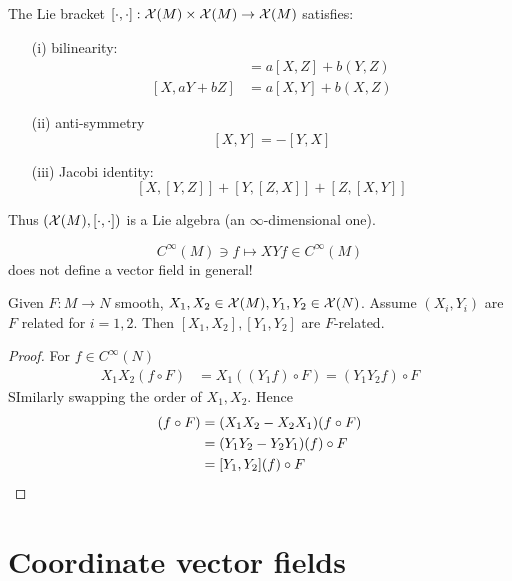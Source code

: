 \begin{remark}
    The Lie bracket \([\cdot,\cdot]:\mathcal{X}(M)\times \mathcal{X}(M)\to \mathcal{X}(M)\) satisfies:
    \begin{enumerate}
        \item[(i)] bilinearity: \begin{align*}
            [aX+bY,Z] &= a[X,Z]+b(Y,Z)\\
            [X,aY+bZ]&=  a[X,Y]+b(X,Z)
        \end{align*} 
        \item[(ii)] anti-symmetry \[[X,Y]=-[Y,X]\]
        \item[(iii)] Jacobi identity: \[[X,[Y,Z]]+[Y,[Z,X]]+[Z,[X,Y]]\] 
    \end{enumerate}
    Thus \((\mathcal{X}(M),[\cdot,\cdot])\) is a Lie algebra (an \(\infty\)-dimensional one).
\end{remark}


\[C^\infty(M)\ni f\mapsto XY f\in C^\infty(M)\] 
does not define a vector field in general!


\begin{lemma}\label{lem:7.6}
    Given \(F:M\to N\) smooth, \(X_1,X_2\in\mathcal{X}(M),Y_1,Y_2\in\mathcal{X}(N)\). Assume 
    \((X_i,Y_i)\) are \(F\) related for \(i=1,2\). Then \([X_1,X_2],[Y_1,Y_2]\) are 
    \(F\)-related.
\end{lemma}

\begin{proof}
     For \(f\in C^\infty(N)\)
    \begin{align*}
        X_1X_2(f\circ F) &= X_1((Y_1f)\circ F)=(Y_1Y_2f)\circ F
    \end{align*}
    SImilarly swapping the order of \(X_1,X_2\). Hence 
    \begin{align*}
        [X_1,X_2](f\circ F)&=(X_1X_2-X_2X_1)(f\circ F)\\
        &=(Y_1Y_2-Y_2Y_1)(f)\circ F\\
        &=[Y_1,Y_2](f)\circ F\qedhere
    \end{align*}
\end{proof}

\section{Coordinate vector fields}

